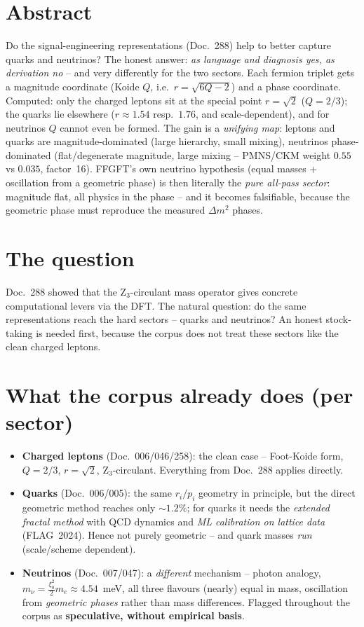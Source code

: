 \section*{Abstract}
Do the signal-engineering representations (Doc.~288) help to better capture quarks and neutrinos? The
honest answer: \emph{as language and diagnosis yes, as derivation no} -- and very differently for the
two sectors. Each fermion triplet gets a magnitude coordinate (Koide $Q$, i.e.\ $r=\sqrt{6Q-2}$) and a
phase coordinate. Computed: only the charged leptons sit at the special point $r=\sqrt2$ ($Q=2/3$); the
quarks lie elsewhere ($r\approx1{.}54$ resp.\ $1{.}76$, and scale-dependent), and for neutrinos $Q$
cannot even be formed. The gain is a \emph{unifying map}: leptons and quarks are magnitude-dominated
(large hierarchy, small mixing), neutrinos phase-dominated (flat/degenerate magnitude, large mixing --
PMNS/CKM weight $0{.}55$ vs $0{.}035$, factor~16). FFGFT's own neutrino hypothesis (equal masses +
oscillation from a geometric phase) is then literally the \emph{pure all-pass sector}: magnitude flat,
all physics in the phase -- and it becomes falsifiable, because the geometric phase must reproduce the
measured $\Delta m^2$ phases.

\section{The question}
Doc.~288 showed that the Z$_3$-circulant mass operator gives concrete computational levers via the DFT.
The natural question: do the same representations reach the hard sectors -- quarks and neutrinos? An
honest stock-taking is needed first, because the corpus does not treat these sectors like the clean
charged leptons.

\section{What the corpus already does (per sector)}
\begin{itemize}
  \item \textbf{Charged leptons} (Doc.~006/046/258): the clean case -- Foot-Koide form, $Q=2/3$,
        $r=\sqrt2$, Z$_3$-circulant. Everything from Doc.~288 applies directly.
  \item \textbf{Quarks} (Doc.~006/005): the same $r_i/p_i$ geometry in principle, but the direct
        geometric method reaches only $\sim1{.}2\%$; for quarks it needs the \emph{extended fractal
        method} with QCD dynamics and \emph{ML calibration on lattice data} (FLAG~2024). Hence not
        purely geometric -- and quark masses \emph{run} (scale/scheme dependent).
  \item \textbf{Neutrinos} (Doc.~007/047): a \emph{different} mechanism -- photon analogy,
        $m_\nu=\tfrac{\xi_0^2}{2}m_e\approx4{.}54$~meV, all three flavours (nearly) equal in mass,
        oscillation from \emph{geometric phases} rather than mass differences. Flagged throughout the
        corpus as \textbf{speculative, without empirical basis}.
\end{itemize}

